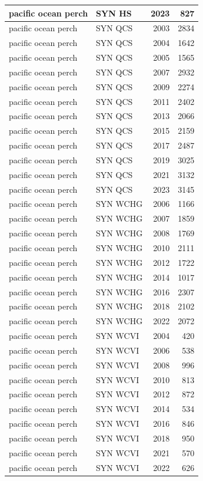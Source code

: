 \documentclass[
  letterpaper,
  DIV=11,
  numbers=noendperiod]{scrartcl}
\begin{document}
\begin{tabular}[t]{l|l|r|r}
\hline
pacific ocean perch & SYN HS & 2023 & 827\\
\hline
pacific ocean perch & SYN QCS & 2003 & 2834\\
\hline
pacific ocean perch & SYN QCS & 2004 & 1642\\
\hline
pacific ocean perch & SYN QCS & 2005 & 1565\\
\hline
pacific ocean perch & SYN QCS & 2007 & 2932\\
\hline
pacific ocean perch & SYN QCS & 2009 & 2274\\
\hline
pacific ocean perch & SYN QCS & 2011 & 2402\\
\hline
pacific ocean perch & SYN QCS & 2013 & 2066\\
\hline
pacific ocean perch & SYN QCS & 2015 & 2159\\
\hline
pacific ocean perch & SYN QCS & 2017 & 2487\\
\hline
pacific ocean perch & SYN QCS & 2019 & 3025\\
\hline
pacific ocean perch & SYN QCS & 2021 & 3132\\
\hline
pacific ocean perch & SYN QCS & 2023 & 3145\\
\hline
pacific ocean perch & SYN WCHG & 2006 & 1166\\
\hline
pacific ocean perch & SYN WCHG & 2007 & 1859\\
\hline
pacific ocean perch & SYN WCHG & 2008 & 1769\\
\hline
pacific ocean perch & SYN WCHG & 2010 & 2111\\
\hline
pacific ocean perch & SYN WCHG & 2012 & 1722\\
\hline
pacific ocean perch & SYN WCHG & 2014 & 1017\\
\hline
pacific ocean perch & SYN WCHG & 2016 & 2307\\
\hline
pacific ocean perch & SYN WCHG & 2018 & 2102\\
\hline
pacific ocean perch & SYN WCHG & 2022 & 2072\\
\hline
pacific ocean perch & SYN WCVI & 2004 & 420\\
\hline
pacific ocean perch & SYN WCVI & 2006 & 538\\
\hline
pacific ocean perch & SYN WCVI & 2008 & 996\\
\hline
pacific ocean perch & SYN WCVI & 2010 & 813\\
\hline
pacific ocean perch & SYN WCVI & 2012 & 872\\
\hline
pacific ocean perch & SYN WCVI & 2014 & 534\\
\hline
pacific ocean perch & SYN WCVI & 2016 & 846\\
\hline
pacific ocean perch & SYN WCVI & 2018 & 950\\
\hline
pacific ocean perch & SYN WCVI & 2021 & 570\\
\hline
pacific ocean perch & SYN WCVI & 2022 & 626\\
\hline
\end{tabular}
\end{document}
